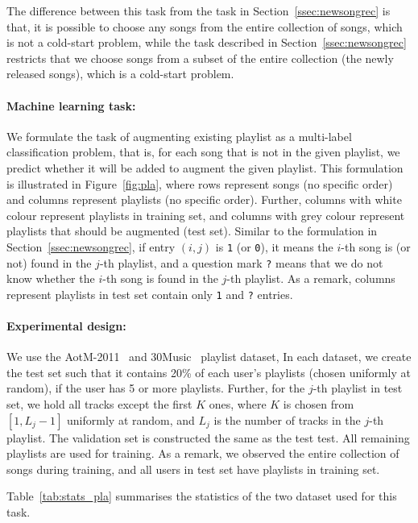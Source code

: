 The difference between this task from the task in Section~\ref{ssec:newsongrec} is that,
it is possible to choose any songs from the entire collection of songs, which is not a cold-start problem,
while the task described in Section~\ref{ssec:newsongrec} restricts that 
we choose songs from a subset of the entire collection (the newly released songs), 
which is a cold-start problem.

\paragraph{Machine learning task:}
We formulate the task of augmenting existing playlist as a multi-label classification problem,
that is, for each song that is not in the given playlist, 
we predict whether it will be added to augment the given playlist.
This formulation is illustrated in Figure~\ref{fig:pla},
where rows represent songs (no specific order) and columns represent playlists (no specific order).
Further, columns with white colour represent playlists in training set, 
and columns with grey colour represent playlists that should be augmented (\ie test set).
Similar to the formulation in Section~\ref{ssec:newsongrec}, if entry $(i, j)$ is \texttt{1} (or \texttt{0}), 
it means the $i$-th song is (or not) found in the $j$-th playlist, 
and a question mark \texttt{?} means that we do not know whether the $i$-th song is found in the $j$-th playlist.
As a remark, columns represent playlists in test set contain only \texttt{1} and \texttt{?} entries.



\paragraph{Experimental design:}
We use the AotM-2011~\cite{mcfee2012hypergraph} and 30Music~\cite{30music2015} playlist dataset,
In each dataset, we create the test set such that it contains 20\% of each user's playlists (chosen uniformly at random),
if the user has 5 or more playlists. Further, for the $j$-th playlist in test set, we hold all tracks except the first $K$ ones,
where $K$ is chosen from $[1, L_j-1]$ uniformly at random, and $L_j$ is the number of tracks in the $j$-th playlist.
The validation set is constructed the same as the test test.
All remaining playlists are used for training.
As a remark, we observed the entire collection of songs during training, 
and all users in test set have playlists in training set.

Table~\ref{tab:stats_pla} summarises the statistics of the two dataset used for this task.

